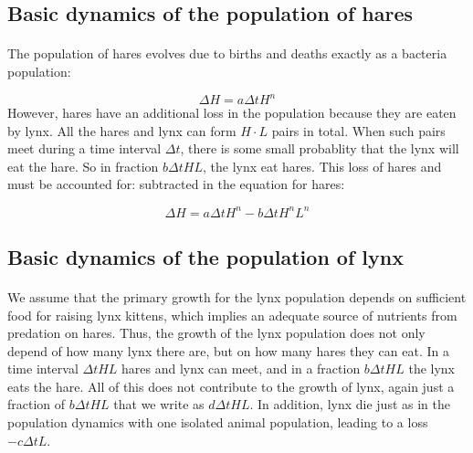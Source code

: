 \documentclass[%
twoside,                 %
final,                   %
10pt]{article}
\begin{document}
\noindent



\subsection{Basic dynamics of the population of hares}


\paragraph{}
The population of hares evolves due to births and deaths exactly as a bacteria population:

\[
\Delta H = a \Delta t H^n
\]
However, hares have an additional loss in the population because
they are eaten by lynx.
All the hares and lynx can form
$H\cdot L$ pairs in total. When such pairs meet during a time
interval $\Delta t$, there is some
small probablity that the lynx will eat the hare.
So in fraction $b\Delta t HL$, the lynx eat hares. This
loss of hares and must be accounted for:
subtracted in the equation for hares:

\[ \Delta H = a\Delta t H^n - b \Delta t H^nL^n\]



\subsection{Basic dynamics of the population of lynx}


\paragraph{}
We assume that the primary growth for the lynx population depends on sufficient food for raising lynx kittens, which implies an adequate source of nutrients from predation on hares. Thus, the growth of the lynx population does not only depend of how many lynx there are, but on how many hares they can eat.
In a time interval $\Delta t HL$ hares and lynx can meet, and in a
fraction $b\Delta t HL$ the lynx eats the hare. All of this does not
contribute to the growth of lynx, again just a fraction of
$b\Delta t HL$ that we write as
$d\Delta t HL$. In addition, lynx die just as in the population
dynamics with one isolated animal population, leading to a loss
$-c\Delta t L$.
\end{document}
